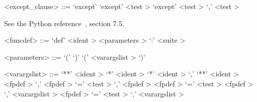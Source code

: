 \label{exceptzzzclauseb}

\begin{grammar}
<except_clause> ::= `except'
	\alt `except' <test \myref[testb]>
	\alt `except' <test \myref[testb]> `,' <test \myref[testb]>
\end{grammar}


\label{funcdefb}

See the Python reference~\cite{pythonlang}, section 7.5.

\begin{grammar}
<funcdef> ::= `def' <ident \myref[identb]> <parameters \myref[parametersb]> `:' <suite \myref[suiteb]>
\end{grammar}


\label{parametersb}

\begin{grammar}
<parameters> ::= `(' `)'
	\alt `(' <varargslist \myref[varargslistb]> `)'
\end{grammar}


\label{varargslistb}

\begin{grammar}
<varargslist> ::= `**' <ident \myref[identb]>
	\alt `*' <ident \myref[identb]>
	\alt `*' <ident \myref[identb]> `,' `**' <ident \myref[identb]>
	\alt <fpdef \myref[fpdefb]> `,'
	\alt <fpdef \myref[fpdefb]> `=' <test \myref[testb]> `,'
	\alt <fpdef \myref[fpdefb]>
	\alt <fpdef \myref[fpdefb]> `=' <test \myref[testb]>
	\alt <fpdef \myref[fpdefb]> `,' <varargslist \myref[varargslistb]>
	\alt <fpdef \myref[fpdefb]> `=' <test \myref[testb]> `,' <varargslist \myref[varargslistb]>
\end{grammar}

